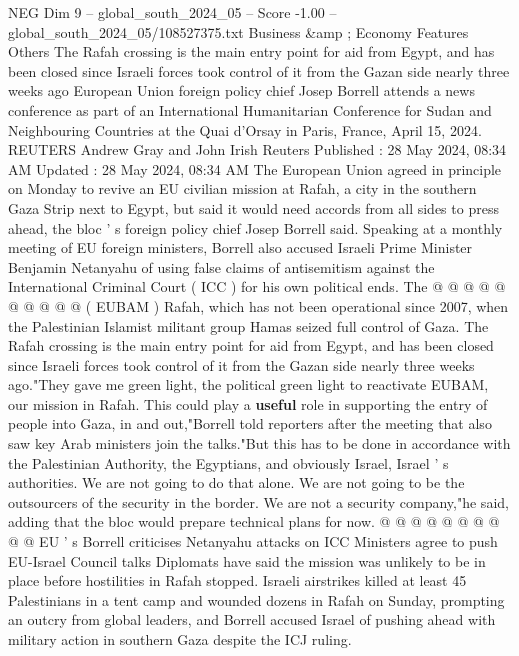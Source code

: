 \begin{textsample}{NEG Dim 9 – global\_south\_2024\_05 – Score -1.00 – global\_south\_2024\_05/108527375.txt}  \label{ex:f9_neg_332}
Business \&amp ; Economy Features Others The Rafah crossing is the main entry point for aid from Egypt, and has been closed since Israeli forces took control of it from the Gazan side nearly three weeks ago European Union foreign policy chief Josep Borrell attends a news conference as part of an International Humanitarian Conference for Sudan and Neighbouring Countries at the Quai d'Orsay in Paris, France, April 15, 2024.
REUTERS Andrew Gray and John Irish Reuters Published : 28 May 2024, 08:34 AM Updated : 28 May 2024, 08:34 AM The European Union agreed in principle on Monday to revive an EU civilian mission at Rafah, a city in the southern Gaza Strip next to Egypt, but said it would need accords from all sides to press ahead, the bloc ' s foreign policy chief Josep Borrell said.
Speaking at a monthly meeting of EU foreign ministers, Borrell also accused Israeli Prime Minister Benjamin Netanyahu of using false claims of antisemitism against the International Criminal Court ( ICC ) for his own political ends.
The @ @ @ @ @ @ @ @ @ @ ( EUBAM ) Rafah, which has not been operational since 2007, when the Palestinian Islamist militant group Hamas seized full control of Gaza.
The Rafah crossing is the main entry point for aid from Egypt, and has been closed since Israeli forces took control of it from the Gazan side nearly three weeks ago."They gave me green light, the political green light to reactivate EUBAM, our mission in Rafah.
This could play a \textbf{useful} role in supporting the entry of people into Gaza, in and out,"Borrell told reporters after the meeting that also saw key Arab ministers join the talks."But this has to be done in accordance with the Palestinian Authority, the Egyptians, and obviously Israel, Israel ' s authorities.
We are not going to do that alone.
We are not going to be the outsourcers of the security in the border.
We are not a security company,"he said, adding that the bloc would prepare technical plans for now. @ @ @ @ @ @ @ @ @ @ EU ' s Borrell criticises Netanyahu attacks on ICC Ministers agree to push EU-Israel Council talks Diplomats have said the mission was unlikely to be in place before hostilities in Rafah stopped.
Israeli airstrikes killed at least 45 Palestinians in a tent camp and wounded dozens in Rafah on Sunday, prompting an outcry from global leaders, and Borrell accused Israel of pushing ahead with military action in southern Gaza despite the ICJ ruling.

\end{textsample}
